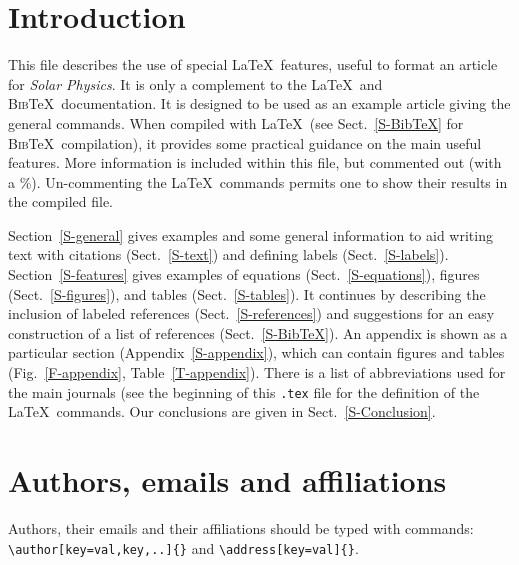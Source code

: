 \documentclass[namedreferences,hyperref,optionalrh]{spr-sola}
\newcommand{\BibTeX}{\textsc{Bib}\TeX}
\begin{document}
\section{Introduction}
     \label{S-Introduction} 

This file describes the use of special \LaTeX\ features,
useful to format an article for {\it Solar Physics}.  It is only a complement
to the \LaTeX\ and \BibTeX\ documentation.  
It is designed to be used as an example
article giving the general commands. When compiled with \LaTeX\ 
(see Sect.~\ref{S-BibTeX} for \BibTeX\ compilation), it provides
some practical guidance on the main useful features. More information
is included within this file, but commented out (with a \%).
Un-commenting the \LaTeX\ commands permits one to show their 
results in the compiled file.   
    
 Section~\ref{S-general} gives examples and some general information
to aid writing text with citations (Sect.~\ref{S-text})
and defining labels (Sect.~\ref{S-labels}).
Section~\ref{S-features} gives examples of equations 
(Sect.~\ref{S-equations}), figures (Sect.~\ref{S-figures}), and 
tables (Sect.~\ref{S-tables}).
It continues by describing the inclusion of labeled references
(Sect.~\ref{S-references}) and suggestions for an easy construction 
of a list of references (Sect.~\ref{S-BibTeX}). 
An appendix is shown as a particular section (Appendix~\ref{S-appendix}),
which can contain figures and tables (Fig.~\ref{F-appendix}, 
Table~\ref{T-appendix}).
There is a list of abbreviations used for the main journals (see the
beginning of this \texttt{.tex} file for the definition of the \LaTeX\ commands.
Our conclusions are given in Sect.~\ref{S-Conclusion}. 

\section{Authors, emails and affiliations}
\label{S-aug}
Authors, their emails and their affiliations should be typed with commands: 
\verb+\author[key=val,key,..]{}+ and \verb+\address[key=val]{}+.
\end{document}
